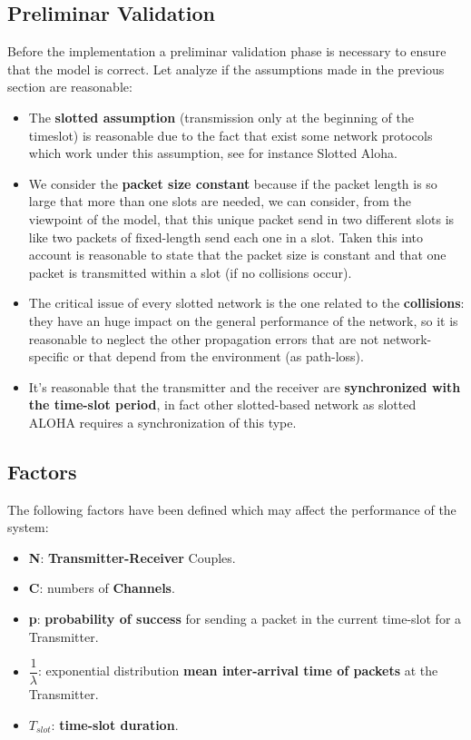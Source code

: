 \subsection{Preliminar Validation}
Before the implementation a preliminar validation phase is necessary to ensure that the model is correct. Let analyze if the assumptions made in the previous section are reasonable:
\begin{itemize}
	\item The \textbf{slotted assumption} (transmission only at the beginning of the timeslot) is reasonable due to the fact that exist some network protocols which work under this assumption, see for instance Slotted Aloha. %
	\item We consider the \textbf{packet size constant} because if the packet length is so large that more than one slots are needed, we can consider, from the viewpoint of the model, that this unique packet send in two different slots is like two packets of fixed-length send each one in a slot. Taken this into account is reasonable to state that the packet size is constant and that one packet is transmitted within a slot (if no collisions occur).
	\item The critical issue of every slotted network is the one related to the \textbf{collisions}: they have an huge impact on the general performance of the network, so it is reasonable to neglect the other propagation errors that are not network-specific or that depend from the environment (as path-loss).
	\item It's reasonable that the transmitter and the receiver are \textbf{synchronized with the time-slot period}, in fact other slotted-based network as slotted ALOHA requires a synchronization of this type.
\end{itemize}
\subsection{Factors}
The following factors have been defined which may affect the performance of the system:
\begin{itemize}
	\item \textbf{N}: \textbf{Transmitter-Receiver} Couples.
	\item \textbf{C}: numbers of \textbf{Channels}.
	\item \textbf{p}: \textbf{probability of success} for sending a packet in the current time-slot for a Transmitter.
	\item \textbf{$\dfrac{1}{\lambda}$}: exponential distribution \textbf{mean inter-arrival time of packets} at the Transmitter.
	\item $T_{slot}$: \textbf{time-slot duration}.
	
\end{itemize}